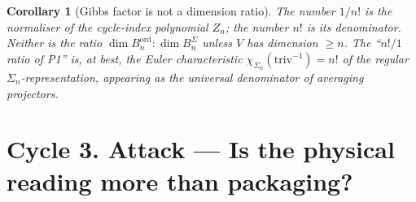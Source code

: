 \documentclass[11pt]{article}
\newtheorem{corollary}[theorem]{Corollary}
\theoremstyle{definition}
\newcommand{\ord}{\mathrm{ord}}
\begin{document}
\begin{corollary}[Gibbs factor is not a dimension ratio]\label{cor:gibbs-not-dim}
The number $1/n!$ is the normaliser of the cycle-index polynomial
$Z_n$; the number $n!$ is its denominator. Neither is the ratio
$\dim B^{\ord}_n : \dim B^{\Sigma}_n$ unless $V$ has dimension $\ge n$.
The ``$n!/1$ ratio of P1'' is, at best, the Euler characteristic
$\chi_{\Sigma_n}(\mathrm{triv}^{-1}) = n!$ of the regular $\Sigma_n$-representation,
appearing as the universal denominator of averaging projectors.
\end{corollary}

\section*{Cycle 3. Attack --- Is the physical reading more than packaging?}
\end{document}
